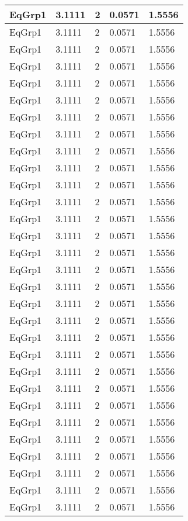 \documentclass{article}
\begin{document}
\begin{longtable}[l]{|p{1.5cm}|p{3cm}|p{3cm}|p{3cm}|p{3cm}|}
\hline
EqGrp1 & 3.1111 & 2 & 0.0571 & 1.5556\\
\hline
EqGrp1 & 3.1111 & 2 & 0.0571 & 1.5556\\
\hline
EqGrp1 & 3.1111 & 2 & 0.0571 & 1.5556\\
\hline
EqGrp1 & 3.1111 & 2 & 0.0571 & 1.5556\\
\hline
EqGrp1 & 3.1111 & 2 & 0.0571 & 1.5556\\
\hline
EqGrp1 & 3.1111 & 2 & 0.0571 & 1.5556\\
\hline
EqGrp1 & 3.1111 & 2 & 0.0571 & 1.5556\\
\hline
EqGrp1 & 3.1111 & 2 & 0.0571 & 1.5556\\
\hline
EqGrp1 & 3.1111 & 2 & 0.0571 & 1.5556\\
\hline
EqGrp1 & 3.1111 & 2 & 0.0571 & 1.5556\\
\hline
EqGrp1 & 3.1111 & 2 & 0.0571 & 1.5556\\
\hline
EqGrp1 & 3.1111 & 2 & 0.0571 & 1.5556\\
\hline
EqGrp1 & 3.1111 & 2 & 0.0571 & 1.5556\\
\hline
EqGrp1 & 3.1111 & 2 & 0.0571 & 1.5556\\
\hline
EqGrp1 & 3.1111 & 2 & 0.0571 & 1.5556\\
\hline
EqGrp1 & 3.1111 & 2 & 0.0571 & 1.5556\\
\hline
EqGrp1 & 3.1111 & 2 & 0.0571 & 1.5556\\
\hline
EqGrp1 & 3.1111 & 2 & 0.0571 & 1.5556\\
\hline
EqGrp1 & 3.1111 & 2 & 0.0571 & 1.5556\\
\hline
EqGrp1 & 3.1111 & 2 & 0.0571 & 1.5556\\
\hline
EqGrp1 & 3.1111 & 2 & 0.0571 & 1.5556\\
\hline
EqGrp1 & 3.1111 & 2 & 0.0571 & 1.5556\\
\hline
EqGrp1 & 3.1111 & 2 & 0.0571 & 1.5556\\
\hline
EqGrp1 & 3.1111 & 2 & 0.0571 & 1.5556\\
\hline
EqGrp1 & 3.1111 & 2 & 0.0571 & 1.5556\\
\hline
EqGrp1 & 3.1111 & 2 & 0.0571 & 1.5556\\
\hline
EqGrp1 & 3.1111 & 2 & 0.0571 & 1.5556\\
\hline
EqGrp1 & 3.1111 & 2 & 0.0571 & 1.5556\\
\hline
EqGrp1 & 3.1111 & 2 & 0.0571 & 1.5556\\
\hline
EqGrp1 & 3.1111 & 2 & 0.0571 & 1.5556\\

\end{longtable}
\end{document}
